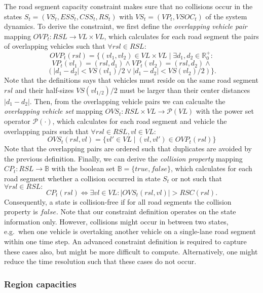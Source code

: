 The road segment capacity constraint makes sure that no collisions occur in the states $S_t = (VS_t, ESS_t, CSS_t, RS_t)$ with $VS_t = (VP_t, VSOC_t)$ of the system dynamics. To derive the constraint, we first define the \textit{overlapping vehicle pair} mapping $OVP_t : RSL \rightarrow VL \times VL$, which calculates for each road segment the pairs of overlapping vehicles such that $\forall rsl \in RSL:$
\[
	OVP_t(rsl) = \{(vl_1, vl_2) \in VL \times VL \mid \exists d_1, d_2 \in \mathbb{R}_0^+:
\]
\[
	VP_t(vl_1) = (rsl, d_1) \wedge VP_t(vl_2) = (rsl, d_2) \wedge
\]
\[
	(|d_1 - d_2| < VS(vl_1) / 2 \vee |d_1 - d_2| < VS(vl_2) / 2) \} \textrm{.}
\]
Note that the definitions says that vehicles must reside on the same road segment $rsl$ and their half-sizes $VS(vl_{1/2}) / 2$ must be larger than their center distances $|d_1 - d_2|$. Then, from the overlapping vehicle pairs we can calcualte the \textit{overlapping vehicle set} mapping $OVS_t : RSL \times VL \rightarrow \mathcal{P}(VL)$ with the power set operator $\mathcal{P}(\cdot)$, which calculates for each road segment and vehicle the overlapping pairs such that $\forall rsl \in RSL, vl \in VL:$
\[
	OVS_t(rsl,vl) = \{vl' \in VL \mid (vl, vl') \in OVP_t(rsl)\}
\]
Note that the overlapping pairs are ordered such that duplicates are avoided by the previous definition. Finally, we can derive the \textit{collision property} mapping $CP_t : RSL \rightarrow \mathbb{B}$ with the boolean set $\mathbb{B} = \{true, false\}$, which calculates for each road segment whether a collision occurred in state $S_t$ or not such that $\forall rsl \in RSL:$
\[
	CP_t(rsl) \Leftrightarrow \exists vl \in VL : |OVS_t(rsl, vl)| > RSC(rsl) \textrm{.}
\]
Consequently, a state is collision-free if for all road segments the collision property is $false$. Note that our constraint definition operates on the state information only. However, collisions might occur in between two states, e.g.\ when one vehicle is overtaking another vehicle on a single-lane road segment within one time step. An advanced constraint definition is required to capture these cases also, but might be more difficult to compute. Alternatively, one might reduce the time resolution such that these cases do not occur.

\subsubsection{Region capacities}
\label{capacities}

